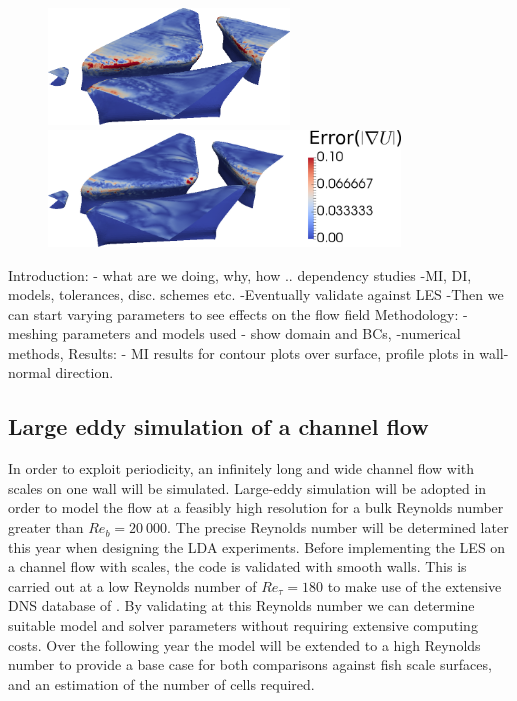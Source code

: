 \documentclass[12pt,oneside,a4paper]{article}
\begin{document}
\begin{figure}
\centering
\includegraphics[height=3.1cm]{images/CFD_meshIndependence/tc3_gradU.png}\hfill \includegraphics[height=3.1cm]{images/CFD_meshIndependence/tc5_gradU_bar.png}\\
\end{figure}


\newpage
Introduction: - what are we doing, why, how ..
dependency studies
-MI, DI, models, tolerances, disc. schemes etc. 
-Eventually validate against LES 
-Then we can start varying parameters to see effects on the flow field
Methodology: - meshing parameters and models used
- show domain and BCs,
-numerical methods,
Results: - MI results for contour plots over surface, profile plots in wall-normal direction.


\newpage
\subsection{Large eddy simulation of a channel flow}
\label{section:les}
In order to exploit periodicity, an infinitely long and wide channel flow with scales on one wall will be simulated. Large-eddy simulation will be adopted in order to model the flow at a feasibly high resolution for a bulk Reynolds number greater than $Re_b = 20\ 000$. The precise Reynolds number will be determined later this year when designing the LDA experiments. Before implementing the LES on a channel flow with scales, the code is validated with smooth walls. This is carried out at a low Reynolds number of $Re_\tau = 180$ to make use of the extensive DNS database of \cite{vreman2014}. By validating at this Reynolds number we can determine suitable model and solver parameters without requiring extensive computing costs. Over the following year the model will be extended to a high Reynolds number to provide a base case for both comparisons against fish scale surfaces, and an estimation of the number of cells required.
\end{document}
